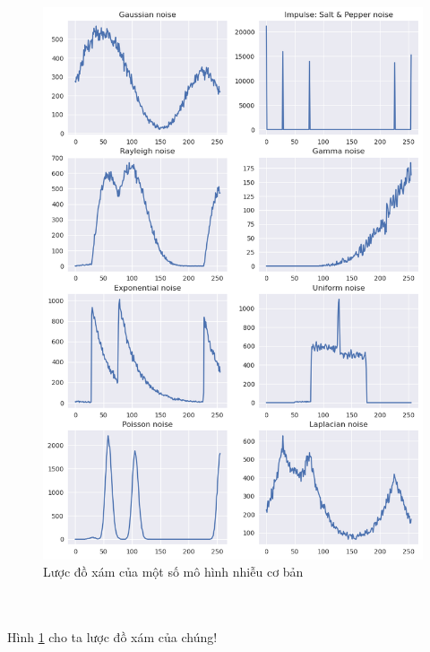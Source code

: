 \documentclass{article}
\begin{document}
    \begin{figure}[ht!]
        \centering
        \includegraphics[width = \linewidth]{n2.png}
        \caption{Lược đồ xám của một số mô hình nhiễu cơ bản}
        \label{fig2}
    \end{figure}
    \\ \\ Hình \ref{fig2} cho ta lược đồ xám của chúng!
\end{document}
